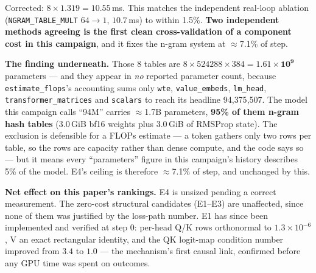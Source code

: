 \documentclass{article}
\begin{document}
Corrected: $8 \times 1.319 = \mathbf{10.55}$\,ms. This matches the independent real-loop ablation (\texttt{NGRAM\_TABLE\_MULT} $64\!\to\!1$, $10.7$\,ms) to within 1.5\%. \textbf{Two independent methods agreeing is the first clean cross-validation of a component cost in this campaign}, and it fixes the n-gram system at $\approx$7.1\% of step.

\textbf{The finding underneath.} Those 8 tables are $8 \times 524288 \times 384 = \mathbf{1.61\times10^{9}}$ parameters --- and they appear in \emph{no} reported parameter count, because \texttt{estimate\_flops}'s accounting sums only \texttt{wte}, \texttt{value\_embeds}, \texttt{lm\_head}, \texttt{transformer\_matrices} and \texttt{scalars} to reach its headline 94{,}375{,}507. The model this campaign calls ``94M'' carries $\approx$1.7B parameters, \textbf{95\% of them n-gram hash tables} (3.0\,GiB bf16 weights plus 3.0\,GiB of RMSProp state). The exclusion is defensible for a FLOPs estimate --- a token gathers only two rows per table, so the rows are capacity rather than dense compute, and the code says so --- but it means every ``parameters'' figure in this campaign's history describes 5\% of the model. E4's ceiling is therefore $\approx$7.1\% of step, and unchanged by this.

\textbf{Net effect on this paper's rankings.} E4 is unsized pending a correct measurement. The zero-cost structural candidates (E1--E3) are unaffected, since none of them was justified by the loss-path number. E1 has since been implemented and verified at step 0: per-head Q/K rows orthonormal to $1.3\!\times\!10^{-6}$, V an exact rectangular identity, and the QK logit-map condition number improved from $3.4$ to $1.0$ --- the mechanism's first causal link, confirmed before any GPU time was spent on outcomes.
\end{document}
